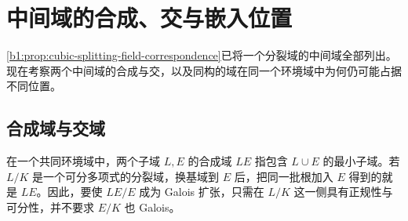 
\section{中间域的合成、交与嵌入位置}
\label{b1:sec:1904}

%
%
%

\cref{b1:prop:cubic-splitting-field-correspondence}已将一个分裂域的中间域全部列出。现在考察两个中间域的合成与交，以及同构的域在同一个环境域中为何仍可能占据不同位置。

\subsection{合成域与交域}
\label{b1:subsec:1904:02}

在一个共同环境域中，两个子域 \(L,E\) 的合成域 \(LE\) 指包含 \(L\cup E\) 的最小子域。若 \(L/K\) 是一个可分多项式的分裂域，换基域到 \(E\) 后，把同一批根加入 \(E\) 得到的就是 \(LE\)。因此，要使 \(LE/E\) 成为 Galois 扩张，只需在 \(L/K\) 这一侧具有正规性与可分性，并不要求 \(E/K\) 也 Galois。

